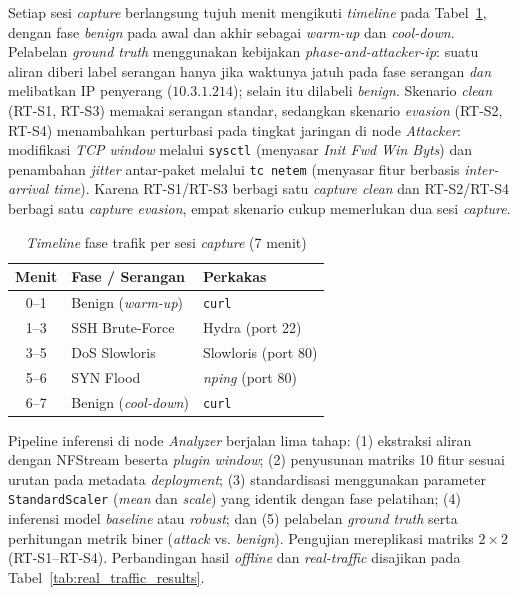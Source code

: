 \documentclass[10pt,twocolumn,a4paper]{extarticle}
\begin{document}
Setiap sesi \textit{capture} berlangsung tujuh menit mengikuti \textit{timeline} pada Tabel~\ref{tab:timeline}, dengan fase \textit{benign} pada awal dan akhir sebagai \textit{warm-up} dan \textit{cool-down}. Pelabelan \textit{ground truth} menggunakan kebijakan \textit{phase-and-attacker-ip}: suatu aliran diberi label serangan hanya jika waktunya jatuh pada fase serangan \textit{dan} melibatkan IP penyerang ($10.3.1.214$); selain itu dilabeli \textit{benign}. Skenario \textit{clean} (RT-S1, RT-S3) memakai serangan standar, sedangkan skenario \textit{evasion} (RT-S2, RT-S4) menambahkan perturbasi pada tingkat jaringan di node \textit{Attacker}: modifikasi \textit{TCP window} melalui \texttt{sysctl} (menyasar \textit{Init Fwd Win Byts}) dan penambahan \textit{jitter} antar-paket melalui \texttt{tc netem} (menyasar fitur berbasis \textit{inter-arrival time}). Karena RT-S1/RT-S3 berbagi satu \textit{capture clean} dan RT-S2/RT-S4 berbagi satu \textit{capture evasion}, empat skenario cukup memerlukan dua sesi \textit{capture}.

\begin{table}[htbp]
\caption{\textit{Timeline} fase trafik per sesi \textit{capture} (7 menit)}
\label{tab:timeline}
\centering
\footnotesize
\begin{tabularx}{\linewidth}{@{} c X l @{}}
\toprule
\textbf{Menit} & \textbf{Fase / Serangan} & \textbf{Perkakas} \\ \midrule
0--1 & Benign (\textit{warm-up}) & \texttt{curl} \\
1--3 & SSH Brute-Force & Hydra (port 22) \\
3--5 & DoS Slowloris & Slowloris (port 80) \\
5--6 & SYN Flood & \textit{nping} (port 80) \\
6--7 & Benign (\textit{cool-down}) & \texttt{curl} \\ \bottomrule
\end{tabularx}
\end{table}

Pipeline inferensi di node \textit{Analyzer} berjalan lima tahap: (1) ekstraksi aliran dengan NFStream beserta \textit{plugin} \textit{window}; (2) penyusunan matriks 10 fitur sesuai urutan pada metadata \textit{deployment}; (3) standardisasi menggunakan parameter \texttt{StandardScaler} (\textit{mean} dan \textit{scale}) yang identik dengan fase pelatihan; (4) inferensi model \textit{baseline} atau \textit{robust}; dan (5) pelabelan \textit{ground truth} serta perhitungan metrik biner (\textit{attack} vs. \textit{benign}). Pengujian mereplikasi matriks $2\times 2$ (RT-S1--RT-S4). Perbandingan hasil \textit{offline} dan \textit{real-traffic} disajikan pada Tabel~\ref{tab:real_traffic_results}.
\end{document}
